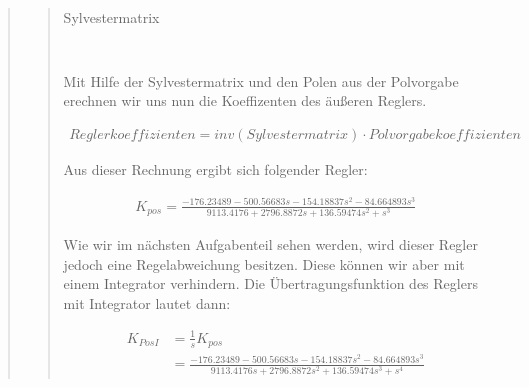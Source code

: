 \begin{quote}
\begin{quote}
\begin{table}[H]
\begin{tabular}{c c c c c c c c}
        \end{tabular}
        \caption{Sylvestermatrix}
        \end{table} 
          \\
         
         Mit Hilfe der Sylvestermatrix und den Polen aus der Polvorgabe erechnen wir uns nun die Koeffizenten des
         äußeren Reglers.
         
         \begin{equation*}
        	\begin{split}
        		Reglerkoeffizienten = inv(Sylvestermatrix) \cdot Polvorgabekoeffizienten
        	\end{split}
        \end{equation*}
                
        
        Aus dieser Rechnung ergibt sich folgender Regler:
        
        \begin{equation*}
        	\begin{split}
        		K_{pos} = \frac{- 176.23489 - 500.56683s - 154.18837s^2 - 84.664893s^3 }{9113.4176 + 2796.8872s + 136.59474s^2
        		+ s^3 }
        	\end{split}
        \end{equation*}
        
        Wie wir im nächsten Aufgabenteil sehen werden, wird dieser Regler jedoch eine Regelabweichung besitzen. Diese
        können wir aber mit einem Integrator verhindern. Die Übertragungsfunktion des Reglers mit Integrator lautet
        dann:
        
        \begin{equation*}
        	\begin{split}
        		K_{PosI} &= \frac{1}{s} K_{pos}\\
        		         &= \frac{- 176.23489 - 500.56683s - 154.18837s^2 - 84.664893s^3 }{9113.4176s + 2796.8872s^2 +
        		         136.59474s^3 + s^4 }
        	\end{split}
        \end{equation*}
    \end{quote}  %
        

\end{quote}
